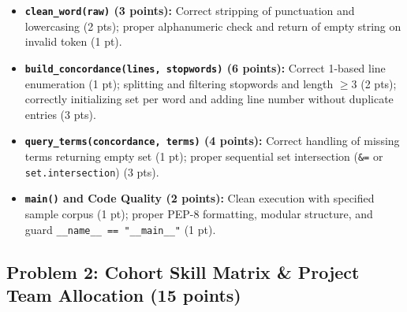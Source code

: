 \documentclass[11pt,a4paper]{article}
\begin{document}
\begin{rubricbox}
\begin{itemize}[leftmargin=1.5em,itemsep=1.5pt]
\item \textbf{\texttt{clean\_word(raw)} (3 points):} Correct stripping of punctuation and lowercasing (2 pts); proper alphanumeric check and return of empty string on invalid token (1 pt).
\item \textbf{\texttt{build\_concordance(lines, stopwords)} (6 points):} Correct 1-based line enumeration (1 pt); splitting and filtering stopwords and length $\ge 3$ (2 pts); correctly initializing set per word and adding line number without duplicate entries (3 pts).
\item \textbf{\texttt{query\_terms(concordance, terms)} (4 points):} Correct handling of missing terms returning empty set (1 pt); proper sequential set intersection (\texttt{\&=} or \texttt{set.intersection}) (3 pts).
\item \textbf{\texttt{main()} and Code Quality (2 points):} Clean execution with specified sample corpus (1 pt); proper PEP-8 formatting, modular structure, and guard \texttt{\_\_name\_\_ == "\_\_main\_\_"} (1 pt).
\end{itemize}
\end{rubricbox}

\newpage
\subsection*{Problem 2: Cohort Skill Matrix \& Project Team Allocation (15 points)}
\end{document}

